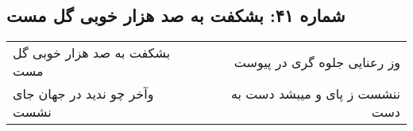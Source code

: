 \begin{center}
\section*{شماره ۴۱: بشکفت به صد هزار خوبی گل مست}
\label{sec:041}
\begin{longtable}{l p{0.5cm} r}
بشکفت به صد هزار خوبی گل مست
&&
وز رعنایی جلوه گری در پیوست
\\
وآخر چو ندید در جهان جای نشست
&&
ننشست ز پای و میبشد دست به دست
\\
\end{longtable}
\end{center}
